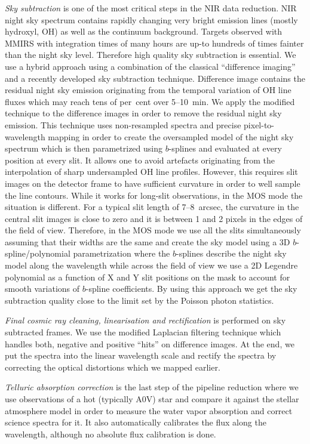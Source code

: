  \emph{Sky subtraction} is one of the most critical steps in the NIR data
reduction.  NIR night sky spectrum contains rapidly changing very bright
emission lines (mostly hydroxyl, OH) as well as the continuum background. 
Targets observed with MMIRS with integration times of many hours are up-to
hundreds of times fainter than the night sky level.  Therefore high quality
sky subtraction is essential.  We use a hybrid approach using a combination
of the classical ``difference imaging'' and a recently developed sky
subtraction technique.  Difference image contains the residual night sky
emission originating from the temporal variation of OH line fluxes which may
reach tens of per~cent over 5--10~min.  We apply the modified
\citet{Kelson03} technique to the difference images in order to remove the
residual night sky emission.  This technique uses non-resampled spectra and
precise pixel-to-wavelength mapping in order to create the oversampled model
of the night sky spectrum which is then parametrized using $b$-splines and
evaluated at every position at every slit.  It allows one to avoid artefacts
originating from the interpolation of sharp undersampled OH line profiles. 
However, this requires slit images on the detector frame to have sufficient
curvature in order to well sample the line contours.  While it works for
long-slit observations, in the MOS mode the situation is different.  For a
typical slit length of 7--8~arcsec, the curvature in the central slit images
is close to zero and it is between 1 and 2 pixels in the edges of the field
of view.  Therefore, in the MOS mode we use all the slits simultaneously
assuming that their widths are the same and create the sky model using a 3D
$b$-spline/polynomial parametrization where the $b$-splines describe the
night sky model along the wavelength while across the field of view we use a
2D Legendre polynomial as a function of X and Y slit positions on the mask
to account for smooth variations of $b$-spline coefficients.  By using this
approach we get the sky subtraction quality close to the limit set by the
Poisson photon statistics.

\emph{Final cosmic ray cleaning, linearisation and rectification} is
performed on sky subtracted frames.  We use the modified Laplacian filtering
technique \citep{vanDokkum01} which handles both, negative and positive
``hits'' on difference images.  At the end, we put the spectra into the
linear wavelength scale and rectify the spectra by correcting the optical
distortions which we mapped earlier.

\emph{Telluric absorption correction} is the last step of the pipeline
reduction where we use observations of a hot (typically A0V) star and
compare it against the stellar atmosphere model in order to measure the water
vapor absorption and correct science spectra for it. It also automatically
calibrates the flux along the wavelength, although no absolute flux
calibration is done.

